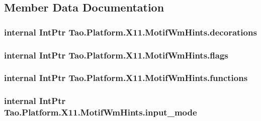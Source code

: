 \subsection{Member Data Documentation}
\hypertarget{struct_tao_1_1_platform_1_1_x11_1_1_motif_wm_hints_a76e7af759b8647fca4d08c24a32b7197}{
\subsubsection[{decorations}]{\setlength{\rightskip}{0pt plus 5cm}internal IntPtr {\bf Tao.Platform.X11.MotifWmHints.decorations}}}
\label{struct_tao_1_1_platform_1_1_x11_1_1_motif_wm_hints_a76e7af759b8647fca4d08c24a32b7197}
\hypertarget{struct_tao_1_1_platform_1_1_x11_1_1_motif_wm_hints_a0ca01223b7523b95f679cc4e5323b395}{
\subsubsection[{flags}]{\setlength{\rightskip}{0pt plus 5cm}internal IntPtr {\bf Tao.Platform.X11.MotifWmHints.flags}}}
\label{struct_tao_1_1_platform_1_1_x11_1_1_motif_wm_hints_a0ca01223b7523b95f679cc4e5323b395}
\hypertarget{struct_tao_1_1_platform_1_1_x11_1_1_motif_wm_hints_ae52194ae8e8f1d70df1dd15f88cec258}{
\subsubsection[{functions}]{\setlength{\rightskip}{0pt plus 5cm}internal IntPtr {\bf Tao.Platform.X11.MotifWmHints.functions}}}
\label{struct_tao_1_1_platform_1_1_x11_1_1_motif_wm_hints_ae52194ae8e8f1d70df1dd15f88cec258}
\hypertarget{struct_tao_1_1_platform_1_1_x11_1_1_motif_wm_hints_a9dbd248379d35767158c1f96fc9c6701}{
\subsubsection[{input\_\-mode}]{\setlength{\rightskip}{0pt plus 5cm}internal IntPtr {\bf Tao.Platform.X11.MotifWmHints.input\_\-mode}}}

